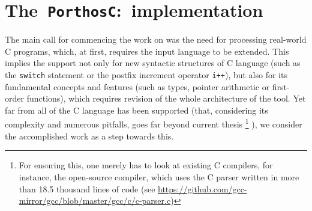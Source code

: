\chapter{The~\texttt{PorthosC}:~implementation}
\label{ch:impl}

The main call for commencing the work on \porthos[2] was the need for processing real-world C programs, which, at first, requires the input language to be extended.
This implies the support not only for new syntactic structures of C language (such as the \texttt{switch} statement or the postfix increment operator \texttt{i++}), but also for its fundamental concepts and features (such as types, pointer arithmetic or first-order functions), which requires revision of the whole architecture of the tool.
Yet far from all of the C language has been supported (that, considering its complexity and numerous pitfalls, goes far beyond current thesis%
\footnote{For ensuring this, one merely has to look at existing C compilers, for instance, the open-source  compiler, which uses the C parser written in more than 18.5 thousand lines of code (see \url{https://github.com/gcc-mirror/gcc/blob/master/gcc/c/c-parser.c})}%
), we consider the accomplished work as a step towards this.





